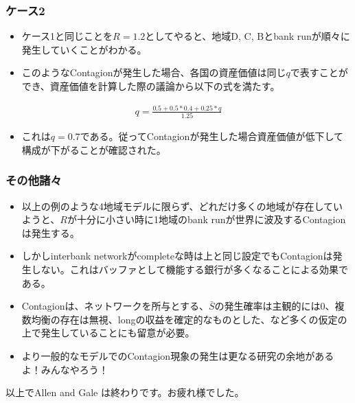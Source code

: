 \documentclass[dvipdfmx, 12pt]{beamer}
\begin{document}
\begin{frame}\frametitle{ケース2}
	\begin{itemize}
	\item ケース1と同じことを$R = 1.2$としてやると、地域D, C, Bとbank runが順々に発生していくことがわかる。
	\item このようなContagionが発生した場合、各国の資産価値は同じ$q$で表すことができ、資産価値を計算した際の議論から以下の式を満たす。
	\end{itemize}
	\begin{align*}
		q = \frac{0.5 + 0.5 * 0.4 + 0.25 * q}{1.25}
	\end{align*}
	\begin{itemize}
	\item これは$q = 0.7$である。従ってContagionが発生した場合資産価値が低下して構成が下がることが確認された。
	\end{itemize}
\end{frame}

\begin{frame}\frametitle{その他諸々}
	\begin{itemize}
	\item 以上の例のような4地域モデルに限らず、どれだけ多くの地域が存在していようと、$R$が十分に小さい時に1地域のbank runが世界に波及するContagionは発生する。
	\item しかしinterbank networkがcompleteな時は上と同じ設定でもContagionは発生しない。これはバッファとして機能する銀行が多くなることによる効果である。
	\item Contagionは、ネットワークを所与とする、$\bar{S}$の発生確率は主観的には0、複数均衡の存在は無視、longの収益を確定的なものとした、など多くの仮定の上で発生していることにも留意が必要。
	\item より一般的なモデルでのContagion現象の発生は更なる研究の余地があるよ！みんなやろう！
	\end{itemize}
\end{frame}

\begin{frame}
	以上でAllen and Gale は終わりです。お疲れ様でした。
\end{frame}
\end{document}
